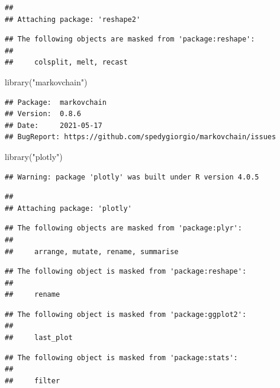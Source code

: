 \documentclass[
]{book}
\newenvironment{Shaded}{\begin{snugshade}}{\end{snugshade}}
\newcommand{\FunctionTok}[1]{\textcolor[rgb]{0.00,0.00,0.00}{#1}}
\newcommand{\NormalTok}[1]{#1}
\newcommand{\StringTok}[1]{\textcolor[rgb]{0.31,0.60,0.02}{#1}}
\begin{document}
\begin{verbatim}
## 
## Attaching package: 'reshape2'
\end{verbatim}

\begin{verbatim}
## The following objects are masked from 'package:reshape':
## 
##     colsplit, melt, recast
\end{verbatim}

\begin{Shaded}
\begin{Highlighting}[]
\FunctionTok{library}\NormalTok{(}\StringTok{"markovchain"}\NormalTok{)}
\end{Highlighting}
\end{Shaded}

\begin{verbatim}
## Package:  markovchain
## Version:  0.8.6
## Date:     2021-05-17
## BugReport: https://github.com/spedygiorgio/markovchain/issues
\end{verbatim}

\begin{Shaded}
\begin{Highlighting}[]
\FunctionTok{library}\NormalTok{(}\StringTok{"plotly"}\NormalTok{)}
\end{Highlighting}
\end{Shaded}

\begin{verbatim}
## Warning: package 'plotly' was built under R version 4.0.5
\end{verbatim}

\begin{verbatim}
## 
## Attaching package: 'plotly'
\end{verbatim}

\begin{verbatim}
## The following objects are masked from 'package:plyr':
## 
##     arrange, mutate, rename, summarise
\end{verbatim}

\begin{verbatim}
## The following object is masked from 'package:reshape':
## 
##     rename
\end{verbatim}

\begin{verbatim}
## The following object is masked from 'package:ggplot2':
## 
##     last_plot
\end{verbatim}

\begin{verbatim}
## The following object is masked from 'package:stats':
## 
##     filter
\end{verbatim}
\end{document}
